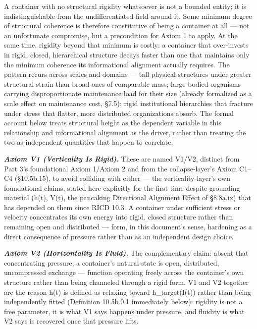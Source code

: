 \documentclass[
]{article}
\begin{document}
A container with no structural rigidity whatsoever is not a bounded
entity; it is indistinguishable from the undifferentiated field around
it. Some minimum degree of structural coherence is therefore
constitutive of being a container at all --- not an unfortunate
compromise, but a precondition for Axiom 1 to apply. At the same time,
rigidity beyond that minimum is costly: a container that over-invests in
rigid, closed, hierarchical structure decays faster than one that
maintains only the minimum coherence its informational alignment
actually requires. The pattern recurs across scales and domains --- tall
physical structures under greater structural strain than broad ones of
comparable mass; large-bodied organisms carrying disproportionate
maintenance load for their size (already formalized as a scale effect on
maintenance cost, §7.5); rigid institutional hierarchies that fracture
under stress that flatter, more distributed organizations absorb. The
formal account below treats structural height as the dependent variable
in this relationship and informational alignment as the driver, rather
than treating the two as independent quantities that happen to
correlate.

\emph{\textbf{Axiom V1 (Verticality Is Rigid).}} These are named V1/V2,
distinct from Part 3's foundational Axiom 1/Axiom 2 and from the
collapse-layer's Axiom C1--C4 (§10.5b.15), to avoid colliding with
either --- the verticality-layer's own foundational claims, stated here
explicitly for the first time despite grounding material (h(t), V(t),
the pancaking Directional Alignment Effect of §8.8a.ix) that has
depended on them since RICD 10.3. A container under sufficient stress or
velocity concentrates its own energy into rigid, closed structure rather
than remaining open and distributed --- form, in this document's sense,
hardening as a direct consequence of pressure rather than as an
independent design choice.

\emph{\textbf{Axiom V2 (Horizontality Is Fluid).}} The complementary
claim: absent that concentrating pressure, a container's natural state
is open, distributed, uncompressed exchange --- function operating
freely across the container's own structure rather than being channeled
through a rigid form. V1 and V2 together are the reason h(t) is defined
as relaxing toward h\_target(I(t)) rather than being independently
fitted (Definition 10.5b.0.1 immediately below): rigidity is not a free
parameter, it is what V1 says happens under pressure, and fluidity is
what V2 says is recovered once that pressure lifts.
\end{document}
